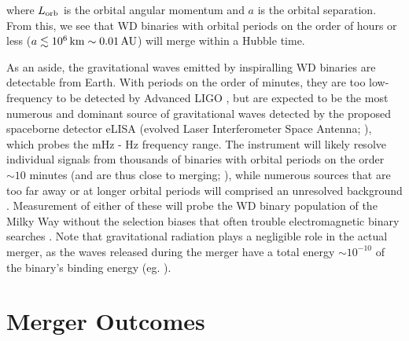 \noindent where $L_\mathrm{orb}$ is the orbital angular momentum and $a$ is the orbital separation.  From this, we see that WD binaries with orbital periods on the order of hours or less ($a \lesssim 10^6\,\mathrm{km} \sim 0.01\,\mathrm{AU}$) will merge within a Hubble time.  


As an aside, the gravitational waves emitted by inspiralling WD binaries are detectable from Earth.  With periods on the order of minutes, they are too low-frequency to be detected by Advanced LIGO \citep{ligo+15}, but are expected to be the most numerous and dominant source of gravitational waves \citep{mars11} detected by the proposed spaceborne detector eLISA (evolved Laser Interferometer Space Antenna; \citealt{amar+13}), which probes the mHz - Hz frequency range.  The instrument will likely resolve individual signals from thousands of binaries with orbital periods on the order $\sim10$ minutes (and are thus close to merging; \citealt{amar+13, mars11, dan+11}), while numerous sources that are too far away or at longer orbital periods will comprised an unresolved background \citep{neleyp01,amar+13}.  Measurement of either of these will probe the WD binary population of the Milky Way without the selection biases that often trouble electromagnetic binary searches \citep{mars11}.  Note that gravitational radiation plays a negligible role in the actual merger, as the waves released during the merger have a total energy $\sim10^{-10}$ of the binary's binding energy (eg. \citeal{loreig09}).


\section{Merger Outcomes}
\label{sec:c1_mergeroutcomes}

